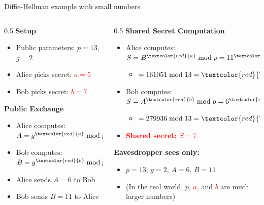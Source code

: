 \ifdefined\PRESENTATION\else\PassOptionsToClass{handout}{beamer}\fi\documentclass[aspectratio=169, lualatex]{beamer}
\begin{document}
\begin{frame}{Diffie-Hellman example with small numbers}
	\begin{columns}[c]
		\begin{column}{0.5\textwidth}
			\textbf{Setup}
			\begin{itemize}[<+->]
				\item Public parameters: $p = 13$, $g = 2$
				\item Alice picks secret: \textcolor{red}{$a = 5$}
				\item Bob picks secret: \textcolor{red}{$b = 7$}
			\end{itemize}
			\pause
			\vspace{0.3cm}
			\textbf{Public Exchange}
			\begin{itemize}[<+->]
				\item Alice computes: $A = g^{\textcolor{red}{a}} \bmod p = 6$
				\item Bob computes: $B = g^{\textcolor{red}{b}} \bmod p = 11$
				\item Alice sends $A = 6$ to Bob
				\item Bob sends $B = 11$ to Alice
			\end{itemize}
		\end{column}
		\begin{column}{0.5\textwidth}
			\pause
			\textbf{Shared Secret Computation}
			\begin{itemize}[<+->]
				\item Alice computes: $S = B^{\textcolor{red}{a}} \bmod p = 11^{\textcolor{red}{5}} \bmod 13$
				      \begin{itemize}
					      \item $= 161051 \bmod 13 = \textcolor{red}{7}$
				      \end{itemize}
				\item Bob computes: $S = A^{\textcolor{red}{b}} \bmod p = 6^{\textcolor{red}{7}} \bmod 13$
				      \begin{itemize}
					      \item $= 279936 \bmod 13 = \textcolor{red}{7}$
				      \end{itemize}
				\item \textcolor{red}{\textbf{Shared secret: $S = 7$}}
			\end{itemize}
			\pause
			\vspace{0.3cm}
			\textbf{Eavesdropper sees only:}
			\begin{itemize}[<+->]
				\item $p = 13$, $g = 2$, $A = 6$, $B = 11$
				\item (In the real world, $p$, \textcolor{red}{$a$}, and \textcolor{red}{$b$} are much larger numbers)
			\end{itemize}
		\end{column}
	\end{columns}
\end{frame}
\end{document}
